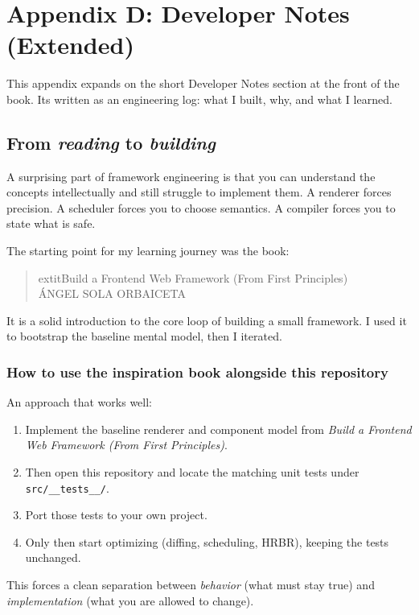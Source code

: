 \chapter{Appendix D: Developer Notes (Extended)}

This appendix expands on the short Developer Notes section at the front of the book.
It\textquotesingle s written as an engineering log: what I built, why, and what I learned.

\section{From \textit{reading} to \textit{building}}
A surprising part of framework engineering is that you can understand the concepts intellectually and still struggle to implement them.
A renderer forces precision.
A scheduler forces you to choose semantics.
A compiler forces you to state what is safe.

The starting point for my learning journey was the book:

\begin{quote}
	extit{Build a Frontend Web Framework (From First Principles)}\\
\textsc{ÁNGEL SOLA ORBAICETA}
\end{quote}

It is a solid introduction to the core loop of building a small framework.
I used it to bootstrap the baseline mental model, then I iterated.

\subsection{How to use the inspiration book alongside this repository}
An approach that works well:

\begin{enumerate}
  \item Implement the baseline renderer and component model from \textit{Build a Frontend Web Framework (From First Principles)}.
  \item Then open this repository and locate the matching unit tests under \texttt{src/\_\_tests\_\_/}.
  \item Port those tests to your own project.
  \item Only then start optimizing (diffing, scheduling, HRBR), keeping the tests unchanged.
\end{enumerate}

This forces a clean separation between \emph{behavior} (what must stay true) and \emph{implementation} (what you are allowed to change).

